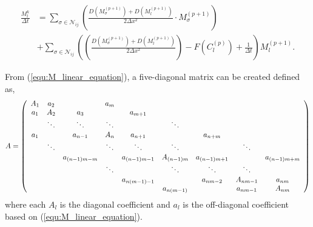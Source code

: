 \begin{equation} \label{equ:M_linear_equation}
\begin{aligned}
  \frac{M^{k}_{l}}{\Delta t} &= 
  \sum_{\sigma \in \mathcal{N}_{ij}} \left( \frac{D(M^{(p+1)}_{\sigma}) + D(M^{(p+1)}_{l})} 
    {2\Delta x^2} \cdot M^{(p+1)}_{\sigma} \right) \\
  & +\sum_{\sigma \in \mathcal{N}_{ij}} \left( \left( \frac{ D(M^{(p+1)}_{\sigma}) + D(M^{(p+1)}_{l})} 
    {2\Delta x^2} \right) - F(C^{(p)}_{l}) + \frac{1}{\Delta t} \right) M^{(p+1)}_{l}.
\end{aligned}
\end{equation} 

From (\ref{equ:M_linear_equation}), a five-diagonal matrix can be created defined as,
\begin{equation} \label{equ:M_matrix_form}
  A = 
    \left( 
      \begin{array}{c c c c c c c c c c}
        A_{1} & a_{2} &  & a_{m} &   \\
        a_{1} & A_2 & a_3 &   &  a_{m+1} &   \\
        & \ddots & \ddots & \ddots & & \ddots & \\
        a_{1} &  & a_{n-1} & A_{n} & a_{n+1} &   &  a_{n+m} &   \\
        & \ddots & & \ddots & \ddots & \ddots & & \ddots\\
        & & a_{(n-1)m - m} &  & a_{(n-1)m-1} & A_{(n-1)m} & a_{(n-1)m+1} &  & a_{(n-1)m +m} \\
        & & & \ddots & & \ddots & \ddots & \ddots & \\
        & & & & a_{n(m-1)-1} & & a_{nm-2} & A_{nm-1} & a_{nm} \\
        & & & & & a_{n(m-1)} & & a_{nm-1} & A_{nm}
      \end{array}
    \right)
\end{equation}
where each $A_l$ is the diagonal coefficient and $a_{l}$ is the off-diagonal coefficient based on (\ref{equ:M_linear_equation}). 

